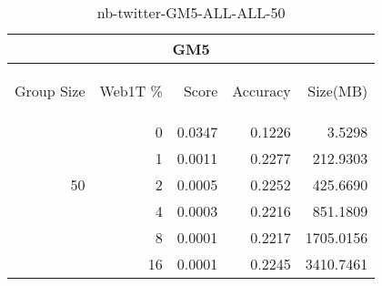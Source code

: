 \begin{center}
\begin{table}[htbp]
\begin{tabular}{ | r | r | r | r | r |}
\hline
\multicolumn{5}{|c|}{GM5}\\
\hline
\begin{sideways}Group Size\end{sideways} & \begin{sideways}Web1T \%\end{sideways} & \begin{sideways}Score\end{sideways} & \begin{sideways}Accuracy\end{sideways} & \begin{sideways}Size(MB)\end{sideways}\\
\hline
\multirow{5}{*}{50}
 & 0 & 0.0347 & 0.1226 & 3.5298\\ \cline{2-5}
 & 1 & 0.0011 & 0.2277 & 212.9303\\ \cline{2-5}
 & 2 & 0.0005 & 0.2252 & 425.6690\\ \cline{2-5}
 & 4 & 0.0003 & 0.2216 & 851.1809\\ \cline{2-5}
 & 8 & 0.0001 & 0.2217 & 1705.0156\\ \cline{2-5}
 & 16 & 0.0001 & 0.2245 & 3410.7461\\ \cline{2-5}
\hline
\end{tabular}
\caption{nb-twitter-GM5-ALL-ALL-50}
\label{table:nb-twitter-GM5-ALL-ALL-50}
\end{table}
\end{center}

